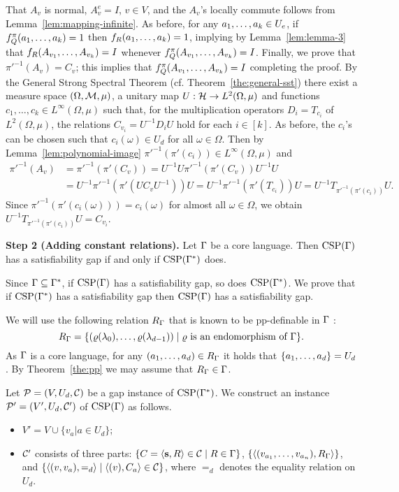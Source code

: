 That $A_v$ is normal, $A_v^e=I$, $v\in V$, and the $A_v$'s locally commute follows from Lemma~\ref{lem:mapping-infinite}. As before, for any $a _1,\ldots, a _{k}\in U_e$, if $f^\pi_Q(a _1,\ldots, a _{k})=1$ then $f_R(a _1,\ldots, a _{k})=1$, implying by Lemma~\ref{lem:lemma-3} that $f_R(A_{v_1},\ldots, A_{v_k})=I$ whenever $f^\pi_Q(A_{v_1},\ldots, A_{v_k})=I$. Finally, we prove that $\pi'^{-1}(A_v)=C_v$; this implies that $f^\pi_Q(A_{v_1},\ldots, A_{v_k})=I$ completing the proof. By the General Strong Spectral Theorem (cf. Theorem~\ref{the:general-sst}) there exist a measure space $(\Omega,{\mathcal M},\mu)$, a unitary map $U:{\mathcal H}\to L^2(\Omega,\mu)$ and functions $c_1,\dots,c_k\in L^\infty(\Omega,\mu)$ such that, for the multiplication operators $D_i = T_{c_i}$ of $L^2(\Omega,\mu)$, the relations $C_{v_i} = U^{-1} D_iU$ hold for each $i\in [k]$. As before, the $c_i$'s can be chosen such that $c_i(\omega)\in U_d$ for all $\omega\in\Omega$. Then by Lemma~\ref{lem:polynomial-image} $\pi'^{-1}(\pi'(c_i))\in L^\infty(\Omega,\mu)$ and 
\begin{align*}
\pi'^{-1}(A_v) &= \pi'^{-1}(\pi'(C_v))=U^{-1}U\pi'^{-1}(\pi'(C_v))U^{-1}U\\
&=U^{-1}\pi'^{-1}(\pi'(UC_vU^{-1}))U=U^{-1}\pi'^{-1}(\pi'(T_{c_i}))U=U^{-1}T_{\pi'^{-1}(\pi'(c_i))}U.
\end{align*}
Since $\pi'^{-1}(\pi'(c_i(\omega)))=c_i(\omega)$ for almost all $\omega\in\Omega$, we obtain $U^{-1}T_{\pi'^{-1}(\pi'(c_i))}U=C_{v_i}$.


\medskip

{\bf Step 2  (Adding constant relations).}
Let $\Gamma$ be a core language. Then ${\rm CSP}(\Gamma)$ has a satisfiability gap if and only if ${\rm CSP}(\Gamma^*)$ does.

\smallskip

Since $\Gamma\subseteq\Gamma^*$, if ${\rm CSP}(\Gamma)$ has a satisfiability gap, so does
${\rm CSP}(\Gamma^*)$. We prove that if ${\rm CSP}(\Gamma^*)$ has a satisfiability gap then
${\rm CSP}(\Gamma)$ has a satisfiability gap.

We will use the following relation $R_\Gamma$ that is known to be pp-definable in $\Gamma$ \cite{Jeavons99:expressive}: 
\[
R_\Gamma=\{(\varrho(\lambda_0),\ldots,\varrho(\lambda_{d-1}))\mid \text{$\varrho$ is an endomorphism of $\Gamma$}\}.
\]
As $\Gamma$ is a core language, for any $(a _1,\ldots, a _{d})\in R_\Gamma$ it holds that $\{a _1,\ldots, a _{d}\}=U_d$. By Theorem~\ref{the:pp} we may assume that $R_\Gamma\in\Gamma$.

Let ${\mathcal P}=(V,U_d,{\mathcal C})$ be a gap instance of ${\rm CSP}(\Gamma^*)$. We construct an instance ${\mathcal P}'=(V',U_d,{\mathcal C}')$ of ${\rm CSP}(\Gamma)$ as follows. 
\begin{itemize}
    \item 
    $V'= V \cup \{v_a | a \in U_d \}$;
    \item
    ${\mathcal C}'$ consists of three parts: $\{C=\langle {\bf s},R \rangle\in{\mathcal C}\mid R\in\Gamma\}$, $\{\langle (v_{a_1},\ldots, v_{a_n}),R_\Gamma \rangle\}$, and  $\{\langle (v,v_a),=_d \rangle\mid \langle (v),C_a \rangle\in{\mathcal C}\}$, where $=_d$ denotes the equality relation on $U_d$.
\end{itemize}

